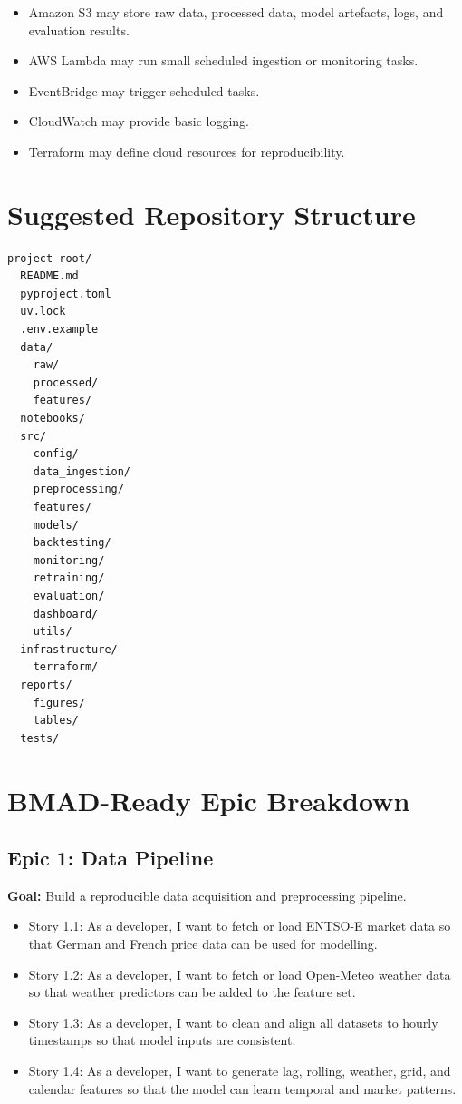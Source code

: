 \documentclass[12pt,a4paper]{article}
\begin{document}
\begin{itemize}
    \item Amazon S3 may store raw data, processed data, model artefacts, logs, and evaluation results.
    \item AWS Lambda may run small scheduled ingestion or monitoring tasks.
    \item EventBridge may trigger scheduled tasks.
    \item CloudWatch may provide basic logging.
    \item Terraform may define cloud resources for reproducibility.
\end{itemize}

\section{Suggested Repository Structure}

\begin{verbatim}
project-root/
  README.md
  pyproject.toml
  uv.lock
  .env.example
  data/
    raw/
    processed/
    features/
  notebooks/
  src/
    config/
    data_ingestion/
    preprocessing/
    features/
    models/
    backtesting/
    monitoring/
    retraining/
    evaluation/
    dashboard/
    utils/
  infrastructure/
    terraform/
  reports/
    figures/
    tables/
  tests/
\end{verbatim}

\section{BMAD-Ready Epic Breakdown}

\subsection{Epic 1: Data Pipeline}

\textbf{Goal:} Build a reproducible data acquisition and preprocessing pipeline.

\begin{itemize}
    \item Story 1.1: As a developer, I want to fetch or load ENTSO-E market data so that German and French price data can be used for modelling.
    \item Story 1.2: As a developer, I want to fetch or load Open-Meteo weather data so that weather predictors can be added to the feature set.
    \item Story 1.3: As a developer, I want to clean and align all datasets to hourly timestamps so that model inputs are consistent.
    \item Story 1.4: As a developer, I want to generate lag, rolling, weather, grid, and calendar features so that the model can learn temporal and market patterns.
\end{itemize}
\end{document}
